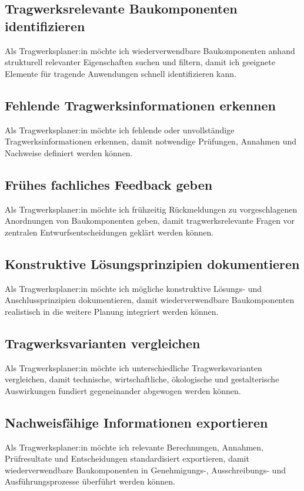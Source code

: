 
\subsection{Tragwerksrelevante Baukomponenten identifizieren}
\label{us:t-01} Als Tragwerksplaner:in möchte ich wiederverwendbare Baukomponenten anhand strukturell relevanter Eigenschaften suchen und filtern, damit ich geeignete Elemente für tragende Anwendungen schnell identifizieren kann.

\subsection{Fehlende Tragwerksinformationen erkennen}
\label{us:t-02} Als Tragwerksplaner:in möchte ich fehlende oder unvollständige Tragwerksinformationen erkennen, damit notwendige Prüfungen, Annahmen und Nachweise definiert werden können.

\subsection{Frühes fachliches Feedback geben}
\label{us:t-03} Als Tragwerksplaner:in möchte ich frühzeitig Rückmeldungen zu vorgeschlagenen Anordnungen von Baukomponenten geben, damit tragwerksrelevante Fragen vor zentralen Entwurfsentscheidungen geklärt werden können.

\subsection{Konstruktive Lösungsprinzipien dokumentieren}
\label{us:t-04} Als Tragwerksplaner:in möchte ich mögliche konstruktive Lösungs- und Anschlussprinzipien dokumentieren, damit wiederverwendbare Baukomponenten realistisch in die weitere Planung integriert werden können.

\subsection{Tragwerksvarianten vergleichen}
\label{us:t-05} Als Tragwerksplaner:in möchte ich unterschiedliche Tragwerksvarianten vergleichen, damit technische, wirtschaftliche, ökologische und gestalterische Auswirkungen fundiert gegeneinander abgewogen werden können.

\subsection{Nachweisfähige Informationen exportieren}
\label{us:t-06} Als Tragwerksplaner:in möchte ich relevante Berechnungen, Annahmen, Prüfresultate und Entscheidungen standardisiert exportieren, damit wiederverwendbare Baukomponenten in Genehmigungs-, Ausschreibungs- und Ausführungsprozesse überführt werden können.

